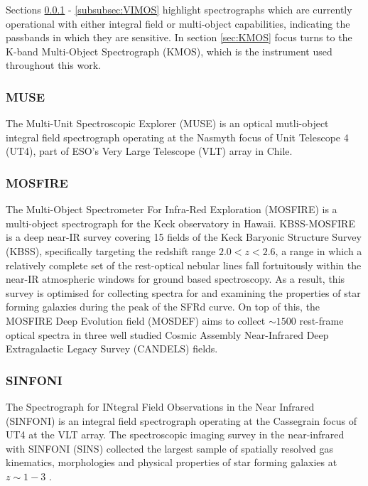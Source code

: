 \documentclass{literature}
\begin{document}
Sections \ref{subsubsec:MUSE} - \ref{subsubsec:VIMOS} highlight spectrographs which are currently operational with either integral field or multi-object capabilities, indicating the passbands in which they are sensitive. In section \ref{sec:KMOS} focus turns to the K-band Multi-Object Spectrograph (KMOS), which is the instrument used throughout this work.     

\subsubsection{MUSE}\label{subsubsec:MUSE}
The Multi-Unit Spectroscopic Explorer (MUSE) \citep{Bacon2010} is an optical mutli-object integral field spectrograph operating at the Nasmyth focus of Unit Telescope 4 (UT4), part of ESO's Very Large Telescope (VLT) array in Chile. 	

\subsubsection{MOSFIRE}\label{subsubsec:MOSFIRE}
The Multi-Object Spectrometer For Infra-Red Exploration (MOSFIRE) \citep{McLean2012} is a multi-object spectrograph for the Keck observatory in Hawaii. KBSS-MOSFIRE is a deep near-IR survey covering 15 fields of the Keck Baryonic Structure Survey (KBSS), specifically targeting the redshift range $2.0 < z < 2.6$, a range in which a relatively complete set of the rest-optical nebular lines fall fortuitously within the near-IR atmospheric windows for ground based spectroscopy. As a result, this survey is optimised for collecting spectra for and examining the properties of star forming galaxies during the peak of the SFRd curve. On top of this, the MOSFIRE Deep Evolution field (MOSDEF) \citep{Kriek2014}  aims to collect $\sim 1500$ rest-frame optical spectra in three well studied Cosmic Assembly Near-Infrared Deep Extragalactic Legacy Survey (CANDELS) \citep{Grogin2011} fields.

\subsubsection{SINFONI}\label{subsubsec:SINFONI}
The Spectrograph for INtegral Field Observations in the Near Infrared (SINFONI) \citep{Eisenhauer2003} is an integral field spectrograph operating at the Cassegrain focus of UT4 at the VLT array. The spectroscopic imaging survey in the near-infrared with SINFONI (SINS) collected the largest sample of spatially resolved gas kinematics, morphologies and physical properties of star forming galaxies at $z \sim 1-3$ \citep{ForsterSchreiber2009}. 
\end{document}
